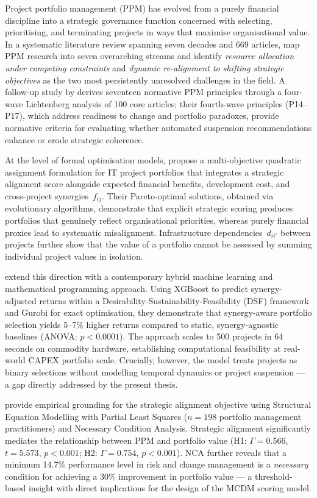 Project portfolio management (PPM) has evolved from a purely financial discipline into a
strategic governance function concerned with selecting, prioritising, and terminating projects
in ways that maximise organisational value. In a systematic literature review spanning seven
decades and 669 articles, \textcite{hansen2022seven} map PPM research into seven overarching
streams and identify \textit{resource allocation under competing constraints} and
\textit{dynamic re-alignment to shifting strategic objectives} as the two most persistently
unresolved challenges in the field. A follow-up study by \textcite{hansen2023principles} derives
seventeen normative PPM principles through a four-wave Lichtenberg analysis of 100 core
articles; their fourth-wave principles (P14--P17), which address readiness to change and
portfolio paradoxes, provide normative criteria for evaluating whether automated suspension
recommendations enhance or erode strategic coherence.

At the level of formal optimisation models, \textcite{chiang2013strategic} propose a
multi-objective quadratic assignment formulation for IT project portfolios that integrates a
strategic alignment score alongside expected financial benefits, development cost, and
cross-project synergies~$f_{ij}$. Their Pareto-optimal solutions, obtained via evolutionary
algorithms, demonstrate that explicit strategic scoring produces portfolios that genuinely
reflect organisational priorities, whereas purely financial proxies lead to systematic
misalignment. Infrastructure dependencies~$d_{ii'}$ between projects further show that the
value of a portfolio cannot be assessed by summing individual project values in isolation.

\textcite{rodriguezgarcia2025ai} extend this direction with a contemporary hybrid machine
learning and mathematical programming approach. Using XGBoost to predict synergy-adjusted
returns within a Desirability-Sustainability-Feasibility (DSF) framework and Gurobi for
exact optimisation, they demonstrate that synergy-aware portfolio selection yields 5--7\%
higher returns compared to static, synergy-agnostic baselines (ANOVA: $p < 0.0001$). The
approach scales to 500 projects in 64 seconds on commodity hardware, establishing
computational feasibility at real-world CAPEX portfolio scale. Crucially, however, the model
treats projects as binary selections without modelling temporal dynamics or project
suspension — a gap directly addressed by the present thesis.

\textcite{rodriguescoelho2025strategic} provide empirical grounding for the strategic alignment
objective using Structural Equation Modelling with Partial Least Squares ($n = 198$
portfolio management practitioners) and Necessary Condition Analysis. Strategic alignment
significantly mediates the relationship between PPM and portfolio value (H1: $\Gamma = 0.566$,
$t = 5.573$, $p < 0.001$; H2: $\Gamma = 0.754$, $p < 0.001$). NCA further reveals that a
minimum 14.7\% performance level in risk and change management is a \textit{necessary}
condition for achieving a 30\% improvement in portfolio value — a threshold-based insight
with direct implications for the design of the MCDM scoring model.

